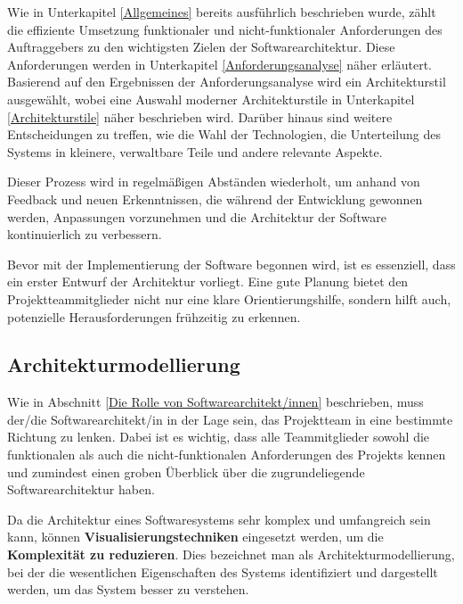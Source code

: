 
Wie in Unterkapitel \ref{Allgemeines} bereits ausführlich beschrieben wurde, zählt die effiziente Umsetzung funktionaler und nicht-funktionaler Anforderungen des Auftraggebers zu den wichtigsten Zielen der Softwarearchitektur. Diese Anforderungen werden in Unterkapitel \ref{Anforderungsanalyse} näher erläutert. Basierend auf den Ergebnissen der Anforderungsanalyse wird ein Architekturstil ausgewählt, wobei eine Auswahl moderner Architekturstile in Unterkapitel \ref{Architekturstile} näher beschrieben wird. Darüber hinaus sind weitere Entscheidungen zu treffen, wie die Wahl der Technologien, die Unterteilung des Systems in kleinere, verwaltbare Teile und andere relevante Aspekte.

Dieser Prozess wird in regelmäßigen Abständen wiederholt, um anhand von Feedback und neuen Erkenntnissen, die während der Entwicklung gewonnen werden, Anpassungen vorzunehmen und die Architektur der Software kontinuierlich zu verbessern.

Bevor mit der Implementierung der Software begonnen wird, ist es essenziell, dass ein erster Entwurf der Architektur vorliegt.
Eine gute Planung bietet den Projektteammitglieder nicht nur eine klare Orientierungshilfe, sondern hilft auch, potenzielle Herausforderungen frühzeitig zu erkennen.
\cite{EA:Web15, EA:Web16}



\subsection{Architekturmodellierung} \label{Architekturmodellierung}

    Wie in Abschnitt \ref{Die Rolle von Softwarearchitekt/innen} beschrieben, muss der/die Softwarearchitekt/in in der Lage sein, das Projektteam in eine bestimmte Richtung zu lenken. Dabei ist es wichtig, dass alle Teammitglieder sowohl die funktionalen als auch die nicht-funktionalen Anforderungen des Projekts kennen und zumindest einen groben Überblick über die zugrundeliegende Softwarearchitektur haben.

    Da die Architektur eines Softwaresystems sehr komplex und umfangreich sein kann, können \textbf{Visualisierungstechniken} eingesetzt werden, um die \textbf{Komplexität zu reduzieren}. Dies bezeichnet man als Architekturmodellierung, bei der die wesentlichen Eigenschaften des Systems identifiziert und dargestellt werden, um das System besser zu verstehen. 
    

